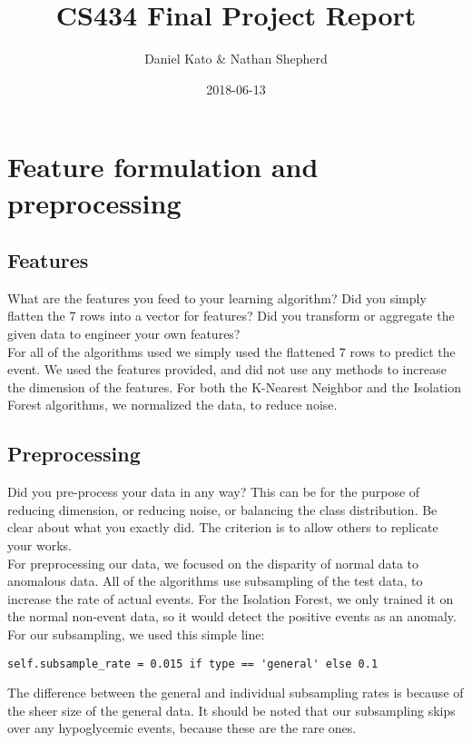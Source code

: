 \documentclass[11pt,a4paper]{article}
\title{CS434 Final Project Report}
\author{Daniel Kato & Nathan Shepherd}
\date{2018-06-13}
\begin{document}
\maketitle

\section{Feature formulation and preprocessing}
\subsection{Features} What are the features you feed to your learning algorithm? Did you simply flatten the 7 rows into a vector for features? Did you transform or aggregate the given data to engineer your own features?\\

For all of the algorithms used we simply used the flattened 7 rows to predict the event.
We used the features provided, and did not use any methods to increase the dimension of the features.
For both the K-Nearest Neighbor and the Isolation Forest algorithms, we normalized the data, to reduce noise.

\subsection{Preprocessing}
Did you pre-process your data in any way? This can be for the purpose of reducing dimension, or reducing noise, or balancing the class distribution. Be clear about what you exactly did. The criterion is to allow others to replicate your works.\\

For preprocessing our data, we focused on the disparity of normal data to anomalous data.
All of the algorithms use subsampling of the test data, to increase the rate of actual events.
For the Isolation Forest, we only trained it on the normal non-event data, so it would detect the positive events as an anomaly.
For our subsampling, we used this simple line:
\begin{lstlisting}
self.subsample_rate = 0.015 if type == 'general' else 0.1
\end{lstlisting}
The difference between the general and individual subsampling rates is because of the sheer size of the general data.
It should be noted that our subsampling skips over any hypoglycemic events, because these are the rare ones.
\end{document}
